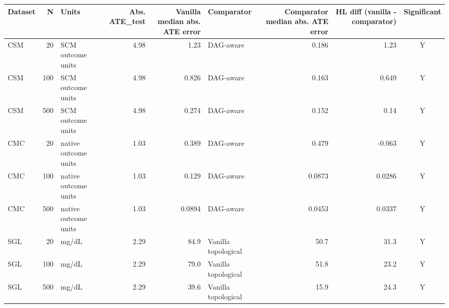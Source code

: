 \begin{tabular}{lrlrrlrrc}
\toprule
Dataset & N & Units & Abs. ATE\_test & Vanilla median abs. ATE error & Comparator & Comparator median abs. ATE error & HL diff (vanilla - comparator) & Significant \\
\midrule
CSM & 20 & SCM outcome units & 4.98 & 1.23 & DAG-aware & 0.186 & 1.23 & Y \\
CSM & 100 & SCM outcome units & 4.98 & 0.826 & DAG-aware & 0.163 & 0.649 & Y \\
CSM & 500 & SCM outcome units & 4.98 & 0.274 & DAG-aware & 0.152 & 0.14 & Y \\
CMC & 20 & native outcome units & 1.03 & 0.389 & DAG-aware & 0.479 & -0.063 & Y \\
CMC & 100 & native outcome units & 1.03 & 0.129 & DAG-aware & 0.0873 & 0.0286 & Y \\
CMC & 500 & native outcome units & 1.03 & 0.0894 & DAG-aware & 0.0453 & 0.0337 & Y \\
SGL & 20 & mg/dL & 2.29 & 84.9 & Vanilla topological & 50.7 & 31.3 & Y \\
SGL & 100 & mg/dL & 2.29 & 79.0 & Vanilla topological & 51.8 & 23.2 & Y \\
SGL & 500 & mg/dL & 2.29 & 39.6 & Vanilla topological & 15.9 & 24.3 & Y \\
\bottomrule
\end{tabular}
